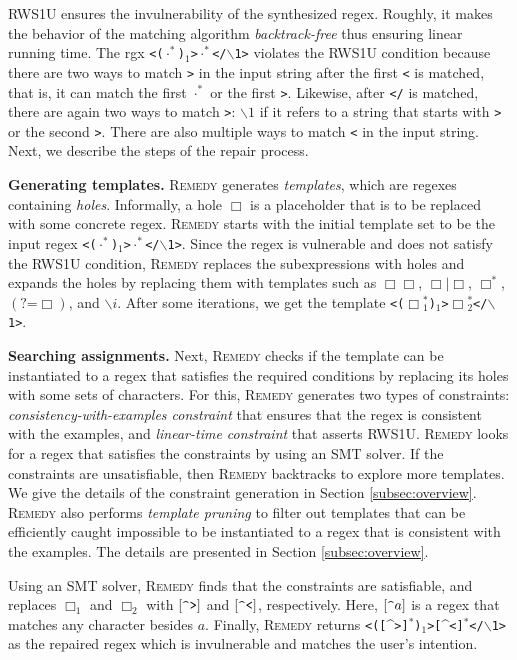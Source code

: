 \documentclass[conference]{IEEEtran}
\newcommand{\tool}{\textsc{Remedy}}
\newcommand{\hole}{\Box}
\newcommand{\any}{\cdot}
\newcommand{\ltp}{RWS1U}
\begin{document}
\ltp{} ensures the invulnerability of the synthesized regex.  Roughly, it makes the behavior of the matching algorithm {\em backtrack-free} thus ensuring linear running time.
The {rgx} \texttt{<($\any^*$)$_1$>$\any^*$</$\backslash$1>} violates the \ltp{} condition because there are two ways to match \texttt{>} in the input string after the first \texttt{<} is matched, that is, it can match the first $\any^*$ or the first \texttt{>}.
Likewise, after \texttt{</} is matched, there are again two ways to match \texttt{>}: $\backslash1$ if it refers to a string that starts with \texttt{>} or the second \texttt{>}.
There are also multiple ways to match \texttt{<} in the input string.
Next, we describe the steps of the repair process.

{\flushleft\bf Generating templates.}
\tool{} generates {\it templates}, which are regexes containing {\em holes}.  Informally, a hole $\hole{}$ is a placeholder that is to be replaced with some concrete regex.  \tool{} starts with the initial template set to be the input regex \texttt{<($\any^*$)$_1$>$\any^*$</$\backslash$1>}.  Since the regex is vulnerable and does not satisfy the \ltp{} condition, \tool{} replaces the subexpressions with holes and expands the holes by replacing them with templates such as $\hole\hole$, $\hole | \hole$, $\hole^*$, $(\text{?=}\hole)$, and $\backslash i$.
After some iterations, we get the template \texttt{<($\hole{}_1^*$)$_1$>$\hole{}_2^*$</$\backslash$1>}.




{\flushleft\bf Searching assignments.}
Next, \tool{} checks if the template can be instantiated to a regex that satisfies the required conditions by replacing its holes with some sets of characters.
For this, \tool{} generates two types of constraints: {\em consistency-with-examples constraint} that ensures that the regex is consistent with the examples, and {\em linear-time constraint} that asserts \ltp{}.  
\tool{} looks for a regex that satisfies the constraints by using an SMT solver.  If the constraints are unsatisfiable, then \tool{} backtracks to explore more templates.  
We give the details of the constraint generation in Section \ref{subsec:overview}. 
\tool{} also performs {\em template pruning} to filter out templates that can be efficiently caught impossible to be instantiated to a regex that is consistent with the examples. 
The details are presented in Section \ref{subsec:overview}.


Using an SMT solver, \tool{} finds that the constraints are satisfiable, and replaces $\hole_1$ and $\hole_2$ with $[\verb|^|\texttt{>}]$ and $[\verb|^|\texttt{<}]$, respectively.  Here, $[\verb|^|a]$ is a regex that matches any character besides $a$.  Finally, \tool{} returns  \texttt{<([}\textasciicircum{}\texttt{>]}$^*$\texttt{)}$_1$\texttt{>[}\textasciicircum{}\texttt{<]}$^*$\texttt{</}$\backslash$\texttt{1>} as the repaired regex which is invulnerable and matches the user's intention.
\end{document}
